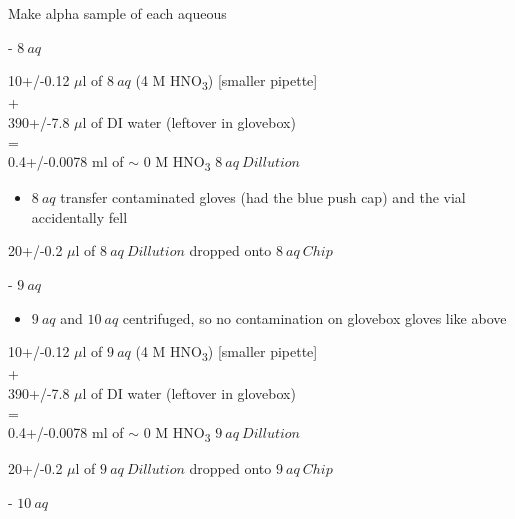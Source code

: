 \documentclass[idxtotoc,hyperref,openany,oneside]{labbook} %
\newcommand{\cmark}{\ding{51}}%
\newcommand{\done}{\rlap{$\square$}{\raisebox{2pt}{\large\hspace{1pt}\cmark}}%
  \hspace{-2.5pt}}
\newcommand{\tsbs}{\textsubscript}
\begin{document}
\begin{todolist}

  
\item[\done]{Make alpha sample of each aqueous}
\begin{todolist}
\item[\done]{- $\boxed{8\ aq}$}
\end{todolist}
\begin{center}
10+/-0.12 $\mu$l of $\boxed{8\ aq}$ (4 M HNO\tsbs{3}) [smaller pipette]\\
+\\
390+/-7.8 $\mu$l of DI water (leftover in glovebox)\\
=\\
0.4+/-0.0078 ml of $\sim$ 0 M HNO\tsbs{3} $\boxed{8\ aq\ Dillution}$
\end{center}
\begin{itemize}
\item{$\boxed{8\ aq}$ transfer contaminated gloves (had the blue
  push cap) and the vial accidentally fell}
\end{itemize}
\vspace{0.3cm}
\begin{center}
  20+/-0.2 $\mu$l of $\boxed{8\ aq\ Dillution}$ dropped onto
  $\boxed{8\ aq\ Chip}$
\end{center}
\begin{todolist}
\item[\done]{- $\boxed{9\ aq}$}
  \begin{itemize}
  \item{$\boxed{9\ aq}$ and $\boxed{10\ aq}$ centrifuged, so
    no contamination on glovebox gloves like above}
  \end{itemize}
\end{todolist}
\begin{center}
10+/-0.12 $\mu$l of $\boxed{9\ aq}$ (4 M HNO\tsbs{3}) [smaller pipette]\\
+\\
390+/-7.8 $\mu$l of DI water (leftover in glovebox)\\
=\\
0.4+/-0.0078 ml of $\sim$ 0 M HNO\tsbs{3} $\boxed{9\ aq\ Dillution}$
\end{center}
\vspace{0.3cm}
\begin{center}
  20+/-0.2 $\mu$l of $\boxed{9\ aq\ Dillution}$ dropped onto
  $\boxed{9\ aq\ Chip}$
\end{center}
\begin{todolist}
\item[\done]{- $\boxed{10\ aq}$}

\end{todolist}
\end{todolist}
\end{document}
